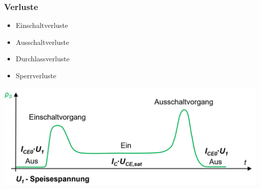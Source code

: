 \begin{minipage}{0.5\linewidth}
    \subsubsection{Verluste}
    \begin{itemize}
        \item Einschaltverluste
        \item Ausschaltverluste
        \item Durchlassverluste
        \item Sperrverluste
    \end{itemize}
\end{minipage}
\begin{minipage}{0.5\linewidth}
    \includegraphics[width=\linewidth]{images/npnTransVerluste}
\end{minipage}
\clearpage

\vspace*{-1cm}
